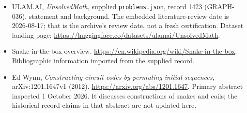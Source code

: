 \documentclass[11pt,a4paper]{article}
\begin{document}
{\small

\begin{itemize}

\item[\hypertarget{source:1423:1}{S1}] ULAM.AI, \emph{UnsolvedMath}, supplied \texttt{problems.json}, record 1423 (GRAPH-036), statement and background. The embedded literature-review date is 2026-08-17; that is the archive’s review date, not a fresh certification. Dataset landing page: \url{https://huggingface.co/datasets/ulamai/UnsolvedMath}.

\item[\hypertarget{source:1423:2}{S2}] Snake-in-the-box overview. \url{https://en.wikipedia.org/wiki/Snake-in-the-box}. Bibliographic information imported from the supplied record.


\item[E1] Ed Wynn, \emph{Constructing circuit codes
by permuting initial sequences}, arXiv:1201.1647v1 (2012).
\url{https://arxiv.org/abs/1201.1647}. Primary abstract inspected
1 October 2026. It discusses constructions of snakes and coils;
the historical record claims in that abstract are not updated here.

\end{itemize}

}

\label{end:1423}
\end{document}
